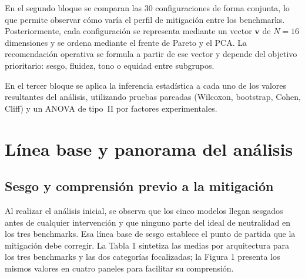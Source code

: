 \documentclass[12pt,a4paper]{report}
\newcommand{\vconfig}{\ensuremath{\mathbf{v}}}
\newcommand{\ndim}{\ensuremath{N}}
\begin{document}
En el segundo bloque se comparan las 30 configuraciones de forma conjunta, lo que permite observar cómo varía el perfil de mitigación entre los benchmarks. Posteriormente, cada configuración se representa mediante un vector \vconfig{} de $\ndim=16$ dimensiones y se ordena mediante el frente de Pareto y el PCA. La recomendación operativa se formula a partir de ese vector y depende del objetivo prioritario: sesgo, fluidez, tono o equidad entre subgrupos.

En el tercer bloque se aplica la inferencia estadística a cada uno de los valores resultantes del análisis, utilizando pruebas pareadas (Wilcoxon, bootstrap, Cohen, Cliff) y un ANOVA de tipo~II por factores experimentales.

\FloatBarrier

\section{Línea base y panorama del análisis}
\label{sec:ex_baseline_panorama}

\subsection{Sesgo y comprensión previo a la mitigación}
\label{subsec:ex_baseline}



Al realizar el análisis inicial, se observa que los cinco modelos llegan sesgados antes de cualquier intervención y que ninguno parte del ideal de neutralidad en los tres benchmarks. Esa línea base de sesgo establece el punto de partida que la mitigación debe corregir. La Tabla 1 sintetiza las medias por arquitectura para los tres benchmarks y las dos categorías focalizadas; la Figura 1 presenta los mismos valores en cuatro paneles para facilitar su comprensión.
\end{document}
